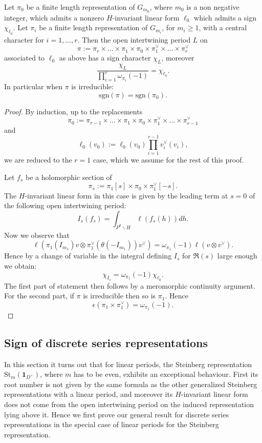 \documentclass[11pt,letterpaper]{amsart}
\newcommand{\re}{\mathfrak{R}}
\newcommand{\triv}{{\mathbf{1}}}
\def\e{\epsilon}
\def\St{\mathrm{St}}
\theoremstyle{plain}
\numberwithin{equation}{section}
\newcommand{\sg}{\mathrm{sgn}}
\begin{document}
\begin{prop}\label{prop open sign}
Let $\pi_0$ be a finite length representation of $G_{m_0}$, where $m_0$ is a non negative integer, which admits a nonzero $H$-invariant linear form $\ell_0$ which admits a sign $\chi_{\ell_0}$. Let $\pi_i$ be a finite length representation of $G_{m_i}$, for $m_i\geq 1$, with a central character for $i=1,\dots,r$. Then the open intertwining period $L$ on 
\[\pi:=\pi_r \times \dots \times \pi_1 \times \pi_0\times  \pi_1^\vee  \times \dots \times  \pi_r^\vee \] associated to $\ell_0$ as above has a sign character $\chi_L$, moreover  
\[\frac{\chi_L}{\prod_{i=1}^r\omega_{\pi_i}(-1)}=\chi_{\ell_0}.\] In particular when $\pi$ is irreducible:
\[\sg(\pi)=\sg(\pi_0).\] 
\end{prop}
\begin{proof}



By induction, up to the replacements \[\pi_0:=\pi_{r-1} \times \dots \times \pi_1 \times \pi_0\times \pi_1^\vee \times \dots \times  \pi_{r-1}^\vee \] and 
\[\ell_0(v_0):=\ell_0(v_0)\prod_{i=1}^{r-1} v_i^\vee(v_i),\] we are reduced to the $r=1$ case, which we assume for the rest of this proof.

Let $f_s$ be a holomorphic section of \[\pi_s:=\pi_1[s]\times \pi_0\times  \pi_1^\vee [-s].\]
The $H$-invariant linear form in this case is given by the leading term at $s=0$ of the following open intertwining period: 
\[I_s(f_s)=\int_{P^{\theta}\backslash H} \ell(f_s(h))dh.\] Now we observe that 
\[\ell(\pi_1(I_{m_1})v\otimes\pi_1^\vee(\theta(-I_{m_1}))v^\vee)
=\omega_{\pi_1}(-1)\ell(v \otimes v^\vee).\] 
Hence by  a change of variable in the integral defining $I_s$ for $\re(s)$ large enough we obtain: 
\[\chi_{I_s}=\omega_{\pi_1}(-1)\chi_{\ell_0}.\] 
The first part of statement then follows by a meromorphic continuity argument. For the second part, if 
$\pi$ is irreducible then so is $\pi_1$. Hence \[\e(\pi_1\times \pi_1^{\vee})=\omega_{\pi_1}(-1).\]
\end{proof}

\subsection{Sign of discrete series representations}

In this section it turns out that for linear periods, the Steinberg representation 
$\St_m(\triv_{D^\times})$, where $m$ has to be even, exhibits an exceptional behaviour. First its root number is not given by the same formula as the other generalized Steinberg representations with a linear period, and moreover its 
$H$-invariant linear form does not come from the open intertwining period on the induced representation lying above it. Hence 
we first prove our general result for discrete series representations in the special case of linear periods for the Steinberg representation.
\end{document}
